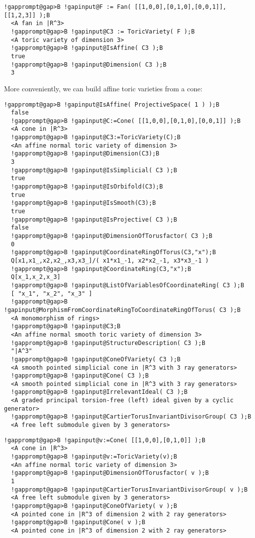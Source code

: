 \documentclass[a4paper,11pt]{report}
\begin{document}
{{{\begin{Verbatim}[commandchars=!@B,fontsize=\small,frame=single,label=Example]
  !gapprompt@gap>B !gapinput@F := Fan( [[1,0,0],[0,1,0],[0,0,1]], [[1,2,3]] );B
  <A fan in |R^3>
  !gapprompt@gap>B !gapinput@C3 := ToricVariety( F );B
  <A toric variety of dimension 3>
  !gapprompt@gap>B !gapinput@IsAffine( C3 );B
  true
  !gapprompt@gap>B !gapinput@Dimension( C3 );B
  3
\end{Verbatim}
 More conveniently, we can build affine toric varieties from a cone: 
\begin{Verbatim}[commandchars=!@B,fontsize=\small,frame=single,label=Example]
  !gapprompt@gap>B !gapinput@IsAffine( ProjectiveSpace( 1 ) );B
  false
  !gapprompt@gap>B !gapinput@C:=Cone( [[1,0,0],[0,1,0],[0,0,1]] );B
  <A cone in |R^3>
  !gapprompt@gap>B !gapinput@C3:=ToricVariety(C);B
  <An affine normal toric variety of dimension 3>
  !gapprompt@gap>B !gapinput@Dimension(C3);B
  3
  !gapprompt@gap>B !gapinput@IsSimplicial( C3 );B
  true
  !gapprompt@gap>B !gapinput@IsOrbifold(C3);B
  true
  !gapprompt@gap>B !gapinput@IsSmooth(C3);B
  true
  !gapprompt@gap>B !gapinput@IsProjective( C3 );B
  false
  !gapprompt@gap>B !gapinput@DimensionOfTorusfactor( C3 );B
  0
  !gapprompt@gap>B !gapinput@CoordinateRingOfTorus(C3,"x");B
  Q[x1,x1_,x2,x2_,x3,x3_]/( x1*x1_-1, x2*x2_-1, x3*x3_-1 )
  !gapprompt@gap>B !gapinput@CoordinateRing(C3,"x");B
  Q[x_1,x_2,x_3]
  !gapprompt@gap>B !gapinput@ListOfVariablesOfCoordinateRing( C3 );B
  [ "x_1", "x_2", "x_3" ]
  !gapprompt@gap>B !gapinput@MorphismFromCoordinateRingToCoordinateRingOfTorus( C3 );B
  <A monomorphism of rings>
  !gapprompt@gap>B !gapinput@C3;B
  <An affine normal smooth toric variety of dimension 3>
  !gapprompt@gap>B !gapinput@StructureDescription( C3 );B
  "|A^3"
  !gapprompt@gap>B !gapinput@ConeOfVariety( C3 );B
  <A smooth pointed simplicial cone in |R^3 with 3 ray generators>
  !gapprompt@gap>B !gapinput@Cone( C3 );B
  <A smooth pointed simplicial cone in |R^3 with 3 ray generators>
  !gapprompt@gap>B !gapinput@IrrelevantIdeal( C3 );B
  <A graded principal torsion-free (left) ideal given by a cyclic generator>
  !gapprompt@gap>B !gapinput@CartierTorusInvariantDivisorGroup( C3 );B
  <A free left submodule given by 3 generators>
\end{Verbatim}
 
\begin{Verbatim}[commandchars=!@B,fontsize=\small,frame=single,label=Example]
  !gapprompt@gap>B !gapinput@v:=Cone( [[1,0,0],[0,1,0]] );B
  <A cone in |R^3>
  !gapprompt@gap>B !gapinput@v:=ToricVariety(v);B
  <An affine normal toric variety of dimension 3>
  !gapprompt@gap>B !gapinput@DimensionOfTorusfactor( v );B
  1
  !gapprompt@gap>B !gapinput@CartierTorusInvariantDivisorGroup( v );B
  <A free left submodule given by 3 generators>
  !gapprompt@gap>B !gapinput@ConeOfVariety( v );B
  <A pointed cone in |R^3 of dimension 2 with 2 ray generators>
  !gapprompt@gap>B !gapinput@Cone( v );B
  <A pointed cone in |R^3 of dimension 2 with 2 ray generators>
\end{Verbatim}
 
}}}
\end{document}
